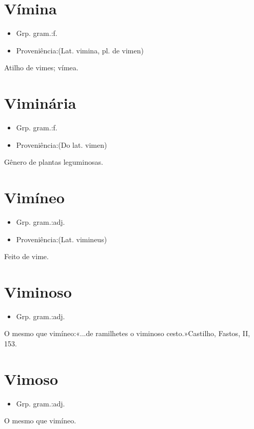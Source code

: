 \documentclass{article}
\begin{document}
\section{Vímina}
\begin{itemize}
\item {Grp. gram.:f.}
\end{itemize}
\begin{itemize}
\item {Proveniência:(Lat. \textunderscore vimina\textunderscore , pl. de \textunderscore vimen\textunderscore )}
\end{itemize}
Atilho de vimes; vímea.
\section{Viminária}
\begin{itemize}
\item {Grp. gram.:f.}
\end{itemize}
\begin{itemize}
\item {Proveniência:(Do lat. \textunderscore vimen\textunderscore )}
\end{itemize}
Gênero de plantas leguminosas.
\section{Vimíneo}
\begin{itemize}
\item {Grp. gram.:adj.}
\end{itemize}
\begin{itemize}
\item {Proveniência:(Lat. \textunderscore vimineus\textunderscore )}
\end{itemize}
Feito de vime.
\section{Viminoso}
\begin{itemize}
\item {Grp. gram.:adj.}
\end{itemize}
O mesmo que \textunderscore vimíneo\textunderscore :«\textunderscore ...de ramilhetes o viminoso cesto.\textunderscore »Castilho, \textunderscore Fastos\textunderscore , II, 153.
\section{Vimoso}
\begin{itemize}
\item {Grp. gram.:adj.}
\end{itemize}
O mesmo que \textunderscore vimíneo\textunderscore .
\end{document}
